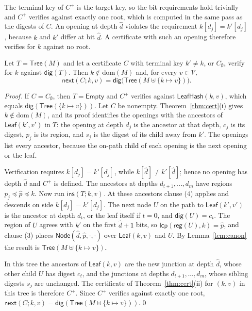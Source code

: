 \documentclass[runningheads]{llncs}
\newcommand{\LeafHash}{\mathsf{LeafHash}}
\newcommand{\dig}{\mathsf{dig}}
\newcommand{\Tree}{\mathsf{Tree}}
\newcommand{\Leaf}{\mathsf{Leaf}}
\newcommand{\Node}{\mathsf{Node}}
\newcommand{\Empty}{\mathsf{Empty}}
\newcommand{\reg}{\mathsf{reg}}
\newcommand{\ins}{\mathsf{ins}}
\newcommand{\nxt}{\mathsf{next}}
\newcommand{\lcp}{\mathsf{lcp}}
\newcommand{\dom}{\mathrm{dom}}
\newcommand{\V}{\mathcal{V}}
\begin{document}
The terminal key of $C^{+}$ is the target key, so the bit requirements hold trivially and $C^{+}$ verifies against exactly one root, which is computed in the same pass as the digests of $C$. An opening at depth $\hat d$ violates the requirement $k[d_j] = k'[d_j]$, because $k$ and $k'$ differ at bit $\hat d$. A certificate with such an opening therefore verifies for $k$ against no root.

\begin{theorem}\label{thm:update}
Let $T = \Tree(M)$ and let a certificate $C$ with terminal key $k' \neq k$, or $C_\emptyset$, verify for $k$ against $\dig(T)$. Then $k \notin \dom(M)$ and, for every $v \in \V$,
\[
  \nxt(C;k,v) = \dig\big(\Tree(M \uplus \{k \mapsto v\})\big).
\]
\end{theorem}
\begin{proof}
If $C = C_\emptyset$, then $T = \Empty$ and $C^{+}$ verifies against $\LeafHash(k,v)$, which equals $\dig(\Tree(\{k \mapsto v\}))$. Let $C$ be nonempty. Theorem~\ref{thm:cert}(i) gives $k \notin \dom(M)$, and its proof identifies the openings with the ancestors of $\Leaf(k',v')$ in $T$: the opening at depth $d_j$ is the ancestor at that depth, $c_j$ is its digest, $p_j$ is its region, and $s_j$ is the digest of its child away from $k'$. The openings list every ancestor, because the on-path child of each opening is the next opening or the leaf.

Verification requires $k[d_j] = k'[d_j]$, while $k[\hat d] \neq k'[\hat d]$; hence no opening has depth $\hat d$ and $C^{+}$ is defined. The ancestors at depths $d_{t+1},\ldots,d_m$ have regions $p_j \preceq \hat p \preceq k$. Now run $\ins(T;k,v)$. At these ancestors clause (4) applies and descends on side $k[d_j] = k'[d_j]$. The next node $U$ on the path to $\Leaf(k',v')$ is the ancestor at depth $d_t$, or the leaf itself if $t = 0$, and $\dig(U) = c_t$. The region of $U$ agrees with $k'$ on the first $\hat d + 1$ bits, so $\lcp(\reg(U),k) = \hat p$, and clause (3) places $\Node(\hat d,\hat p,\cdot,\cdot)$ over $\Leaf(k,v)$ and $U$. By Lemma~\ref{lem:canon} the result is $\Tree(M \uplus \{k \mapsto v\})$.

In this tree the ancestors of $\Leaf(k,v)$ are the new junction at depth $\hat d$, whose other child $U$ has digest $c_t$, and the junctions at depths $d_{t+1},\ldots,d_m$, whose sibling digests $s_j$ are unchanged. The certificate of Theorem~\ref{thm:cert}(ii) for $(k,v)$ in this tree is therefore $C^{+}$. Since $C^{+}$ verifies against exactly one root, $\nxt(C;k,v) = \dig(\Tree(M \uplus \{k \mapsto v\}))$.\qed
\end{proof}
\end{document}
